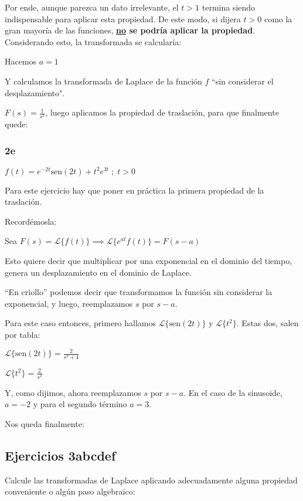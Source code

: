 \documentclass[11pt]{article}
\def\sen{\mathrm{sen}}
\newcommand{\lapl}[1]{\mathscr{L} \lbrace {#1} \rbrace}
\begin{document}
	Por ende, aunque parezca un dato irrelevante, el $t>1$ termina siendo indispensable para aplicar esta propiedad. De este modo, si dijera $t>0$ como la gran mayoría de las funciones, \textbf{\underline{no} se podría aplicar la propiedad}.
	Considerando esto, la transformada se calcularía:
	
	Hacemos $a=1$
	
	Y calculamos la transformada de Laplace de la función $f$ ``sin considerar el desplazamiento".
	
	$\displaystyle F(s)=\frac{1}{s^2}$, luego aplicamos la propiedad de traslación, para que finalmente quede:
	
	
	\subsubsection{2e}
	$f(t)=e^{-2t}\sen (2t)+t^{2}e^{3t} \;;\; t>0$
	
	Para este ejercicio hay que poner en práctica la primera propiedad de la traslación.
	
	Recordémosla:
	
	Sea $F(s)=\lapl{f(t)} \implies \lapl{e^{at}f(t)}=F(s-a)$
	
	Esto quiere decir que multiplicar por una exponencial en el dominio del tiempo, genera un desplazamiento en el dominio de Laplace.
	
    ``En criollo'' podemos decir que transformamos la función sin considerar la exponencial, y luego, reemplazamos $s$ por $s-a$.
    
    Para este caso entonces, primero hallamos $\lapl{\sen(2t)}$ y $\lapl{t^{2}}$. Estas dos, salen por tabla:
    
    $\displaystyle \lapl{\sen(2t)}=\frac{2}{s^{2}+4}$
    
    $\displaystyle \lapl{t^{2}}=\frac{2}{s^{3}}$
    
    Y, como dijimos, ahora reemplazamos $s$ por $s-a$. En el caso de la sinusoide, $a=-2$ y para el segundo término $a=3$.
    
    Nos queda finalmente:
    
    
    \subsection{Ejercicios 3abcdef}
    Calcule las transformadas de Laplace aplicando adecuadamente alguna propiedad conveniente o algún paso algebraico:
    
\end{document}

